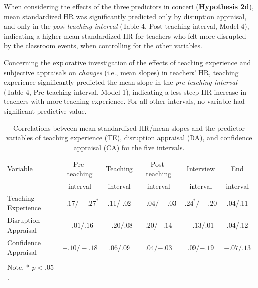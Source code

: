 \documentclass[preprint, 3p,
authoryear]{elsarticle} %
\begin{document}
When considering the effects of the three predictors in concert
(\textbf{Hypothesis 2d}), mean standardized HR was significantly
predicted only by disruption appraisal, and only in the
\emph{post-teaching interval} (Table 4, Post-teaching interval, Model
4), indicating a higher mean standardized HR for teachers who felt more
disrupted by the classroom events, when controlling for the other
variables.

Concerning the explorative investigation of the effects of teaching
experience and subjective appraisals on \emph{changes} (i.e., mean
slopes) in teachers' HR, teaching experience significantly predicted the
mean slope in the \emph{pre-teaching interval} (Table 4, Pre-teaching
interval, Model 1), indicating a less steep HR increase in teachers with
more teaching experience. For all other intervals, no variable had
significant predictive value.

\renewcommand{\arraystretch}{1.5}

\begin{table}[ht]
    \centering
    \begin{tabularx}{\textwidth}{lccccc}
        \toprule
        Variable & Pre-teaching & Teaching & Post-teaching & Interview & End \\
        & interval & interval & interval & interval & interval \\
        \midrule
        Teaching Experience & $- .17/ - .27^*$ & .11/-.02 & $- .04/-.03$ & $.24^*/-.20$ & .04/.11 \\
        Disruption Appraisal & $- .01/.16$ & $- .20/.08$ & .20/$- .14$ & $- .13/.01$ & .04/.12 \\
        Confidence Appraisal & $- .10/ - .18$ & .06/.09 & .04/$- .03$ & .09/$- .19$ & $- .07/.13$ \\
        \bottomrule \\
          Note. * $p < .05$.
    \end{tabularx}
    \caption{Correlations between mean standardized HR/mean slopes and the predictor variables of teaching experience (TE), disruption appraisal (DA), and confidence appraisal (CA) for the five intervals.}
    \label{tab_3}
\end{table}
\end{document}

